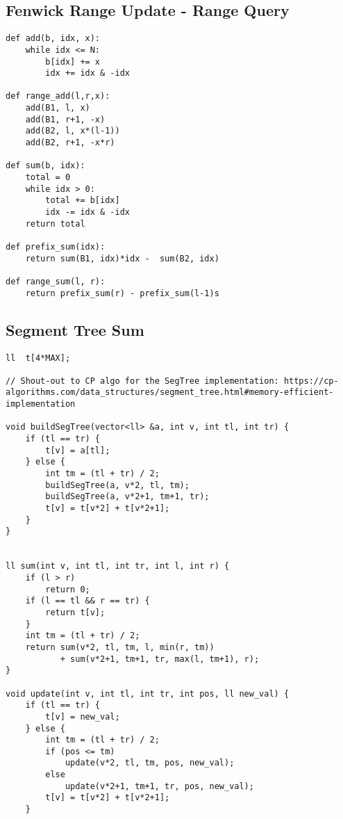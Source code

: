 \documentclass{article}
\begin{document}
\subsection{Fenwick Range Update - Range Query}
\begin{lstlisting}
def add(b, idx, x):
    while idx <= N:
        b[idx] += x
        idx += idx & -idx

def range_add(l,r,x):
    add(B1, l, x)
    add(B1, r+1, -x)
    add(B2, l, x*(l-1))
    add(B2, r+1, -x*r)

def sum(b, idx):
    total = 0
    while idx > 0:
        total += b[idx]
        idx -= idx & -idx
    return total

def prefix_sum(idx):
    return sum(B1, idx)*idx -  sum(B2, idx)

def range_sum(l, r):
    return prefix_sum(r) - prefix_sum(l-1)s
\end{lstlisting}
\subsection{Segment Tree Sum}
\begin{lstlisting}
ll  t[4*MAX];
 
// Shout-out to CP algo for the SegTree implementation: https://cp-algorithms.com/data_structures/segment_tree.html#memory-efficient-implementation
 
void buildSegTree(vector<ll> &a, int v, int tl, int tr) {
    if (tl == tr) {
        t[v] = a[tl];
    } else {
        int tm = (tl + tr) / 2;
        buildSegTree(a, v*2, tl, tm);
        buildSegTree(a, v*2+1, tm+1, tr);
        t[v] = t[v*2] + t[v*2+1];
    }
}
 
 
ll sum(int v, int tl, int tr, int l, int r) {
    if (l > r) 
        return 0;
    if (l == tl && r == tr) {
        return t[v];
    }
    int tm = (tl + tr) / 2;
    return sum(v*2, tl, tm, l, min(r, tm))
           + sum(v*2+1, tm+1, tr, max(l, tm+1), r);
}
 
void update(int v, int tl, int tr, int pos, ll new_val) {
    if (tl == tr) {
        t[v] = new_val;
    } else {
        int tm = (tl + tr) / 2;
        if (pos <= tm)
            update(v*2, tl, tm, pos, new_val);
        else
            update(v*2+1, tm+1, tr, pos, new_val);
        t[v] = t[v*2] + t[v*2+1];
    }

\end{lstlisting}
\end{document}
